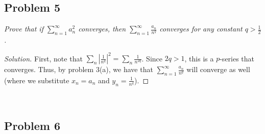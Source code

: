 \documentclass{article}
\begin{document}
\subsection*{Problem 5}
{\it Prove that if $\sum^\infty_{n=1}a^2_n$ converges,
then $\sum_{n=1}^\infty \frac{a_n}{n^q}$
converges for any constant $q > \frac{1}{2}$.}

\begin{proof}[Solution]\let\qed\relax
	First, note that $\sum_{n}|\frac{1}{n^q}|^2 = \sum_n \frac{1}{n^{2q}}$.
	Since $2q > 1$, this is a $p$-series that converges.
	Thus, by problem 3(a), we have that
	$\sum_{n=1}^\infty \frac{a_n}{n^q}$ will converge as well
	(where  we substitute $x_n = a_n$ and $y_n = \frac{1}{n^q}$).
\end{proof} 
\clearpage
~\clearpage

\subsection*{Problem 6}
\end{document}
